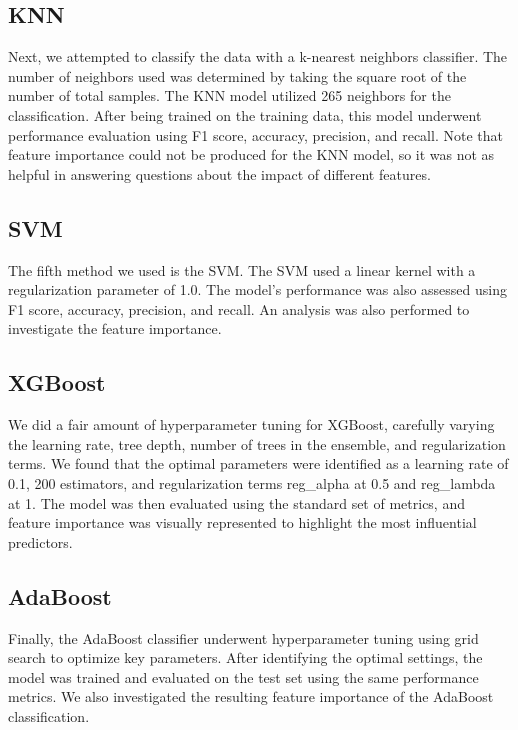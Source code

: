 \documentclass[]{article}
\begin{document}
\subsection{KNN}
Next, we attempted to classify the data with a k-nearest neighbors classifier. The number of neighbors used was determined by taking the square root of the number of total samples. The KNN model utilized 265 neighbors for the classification. After being trained on the training data, this model underwent performance evaluation using F1 score, accuracy, precision, and recall. Note that feature importance could not be produced for the KNN model, so it was not as helpful in answering questions about the impact of different features.

\subsection{SVM}
The fifth method we used is the SVM. The SVM used a linear kernel with a regularization parameter of 1.0. The model's performance was also assessed using F1 score, accuracy, precision, and recall. An analysis was also performed to investigate the feature importance.

\subsection{XGBoost}
We did a fair amount of hyperparameter tuning for XGBoost, carefully varying the learning rate, tree depth, number of trees in the ensemble, and regularization terms. We found that the optimal parameters were identified as a learning rate of 0.1, 200 estimators, and regularization terms reg\_alpha at 0.5 and reg\_lambda at 1. The model was then evaluated using the standard set of metrics, and feature importance was visually represented to highlight the most influential predictors.

\subsection{AdaBoost}
Finally, the AdaBoost classifier underwent hyperparameter tuning using grid search to optimize key parameters. After identifying the optimal settings, the model was trained and evaluated on the test set using the same performance metrics. We also investigated the resulting feature importance of the AdaBoost classification. 
\end{document}
